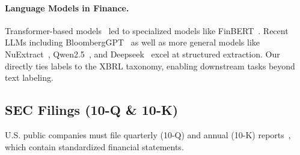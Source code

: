 \paragraph{Language Models in Finance.}
Transformer-based models~\citep{vaswani2017attention} led to specialized models like FinBERT~\citep{yang2020finbert}. 
Recent LLMs including BloombergGPT~\cite{wu2023bloomberggpt} as well as more general models like NuExtract~\citep{cripwell2024nuextract}, Qwen2.5~\citep{qwen2025qwen25technicalreport}, and Deepseek~\citep{deepseekai2024deepseekv3technicalreport} excel at structured extraction.
Our \hifi{} directly ties labels to the XBRL taxonomy, enabling downstream tasks beyond text labeling.

\subsection{SEC Filings (10-Q \& 10-K)}
U.S. public companies must file quarterly (10-Q) and annual (10-K) reports~\citep{SECFinalRule2000,sec_exchange_2024}, which contain standardized financial statements.

